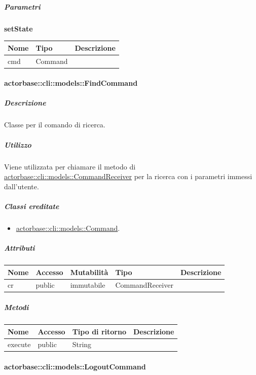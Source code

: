 \documentclass{scalatekids-article}
\begin{document}
\subparagraph{Parametri}

\begin{center}
	\textbf{setState}
\end{center}
\begin{tabular}{| l | l | l |}
	\hline
	Nome & Tipo & Descrizione\\
	\hline
	cmd & Command & \\
	\hline
\end{tabular}

\paragraph{actorbase::cli::models::FindCommand}
\label{sec:actorbase::cli::models::FindCommand}

\subparagraph{Descrizione}

Classe per il comando di ricerca.

\subparagraph{Utilizzo}

Viene utilizzata per chiamare il metodo di
\hyperref[sec:actorbase::cli::models::CommandReceiver]{actorbase::cli::models::CommandReceiver} per la ricerca con i parametri immessi
dall'utente.

\subparagraph{Classi ereditate}

\begin{itemize}
\item \hyperref[sec:actorbase::cli::models::Command]{actorbase::cli::models::Command}.
\end{itemize}

\subparagraph{Attributi}

\begin{tabular}{| l | l | l | l | l |}
	\hline
	Nome & Accesso & Mutabilità & Tipo & Descrizione\\
	\hline
	cr & public & immutabile & CommandReceiver & \\
	\hline
\end{tabular}

\subparagraph{Metodi}

\begin{tabular}{| l | l | l | l |}
	\hline
	Nome & Accesso & Tipo di ritorno & Descrizione\\
	\hline
	execute & public & String & \\
	\hline
\end{tabular}

\paragraph{actorbase::cli::models::LogoutCommand}
\label{sec:actorbase::cli::models::LogoutCommand}
\end{document}
